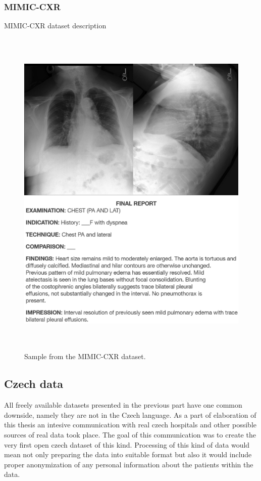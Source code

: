 \subsubsection{MIMIC-CXR}
MIMIC-CXR dataset description

\begin{figure}[h]\centering
\includegraphics[width=135mm, height=163mm]{../img/mimic_s57861150}
\caption{Sample from the MIMIC-CXR dataset.}
\label{fig02:MimicCXRSample}
\end{figure}

\newpage

\subsection{Czech data}
All freely available datasets presented in the previous part have one common downside, namely they are not in the Czech language. As a part of elaboration of this thesis an intesive communication with real czech hospitals and other possible sources of real data took place. The goal of this communication was to create the very first open czech dataset of this kind. Processing of this kind of data would mean not only preparing the data into suitable format but also it would include proper anonymization of any personal information about the patients within the data. \\

